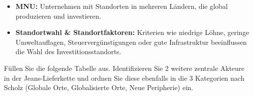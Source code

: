 \begin{myexercise}[ADI]
\begin{myanswer}
\begin{itemize}
            \item \textbf{\gls{MNU}:}
                  Unternehmen mit Standorten in mehreren Ländern, die global produzieren und investieren.

            \item \textbf{Standortwahl \& Standortfaktoren:}
                  Kriterien wie niedrige Löhne, geringe Umweltauflagen, Steuervergünstigungen oder gute Infrastruktur beeinflussen die Wahl des Investitionsstandorts.
        \end{itemize}
    \end{myanswer}

\end{myexercise}

\begin{myexercise}
    Füllen Sie die folgende Tabelle aus. Identifizieren Sie 2 weitere zentrale Akteure in der Jeans-Lieferkette und ordnen Sie diese ebenfalls in die 3 Kategorien nach Scholz (Globale Orte, Globalisierte Orte, Neue Peripherie) ein.


\end{myexercise}
